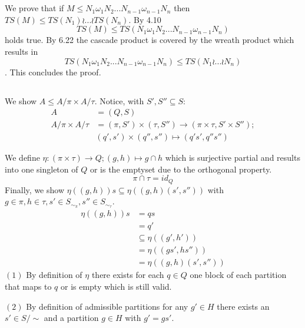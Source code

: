 \documentclass[a4paper,12pt,numbers=noenddot]{scrreport}
\begin{document}

\chapter{}
\section{}
We prove that if $M \leq N_1 \omega_1 N_2 ... N_{n-1}\omega_{n-1} N_n$ then $TS(M) \leq TS(N_1) \wr ... \wr TS(N_n)$.
By 4.10 
$$TS(M) \leq TS(N_1 \omega_1 N_2 ... N_{n-1}\omega_{n-1} N_n)$$ holds true.
By 6.22 the cascade product is covered by the wreath product which results in 
$$TS(N_1 \omega_1 N_2 ... N_{n-1}\omega_{n-1} N_n) \leq TS(N_1 \wr ... \wr N_n)$$.
This concludes the proof.
\section{}
We show $A \leq A/\pi \times A/\tau$.
Notice, with $S', S'' \subseteq S$:
\begin{align*}
    A &= (Q, S) \\
    A/\pi \times A/\tau &= (\pi, S') \times (\tau, S'') \rightarrow (\pi \times \tau, S' \times S'');\\
    &(q', s') \times (q'', s'') \mapsto (q's', q''s'')
\end{align*}

We define $\eta: (\pi \times \tau) \rightarrow Q; (g, h) \mapsto g \cap h$ which is surjective partial and results into one singleton of $Q$ or is the emptyset due to the orthogonal property.
$$\pi \cap \tau = id_Q$$
Finally, we show $\eta((g,h))s \subseteq \eta((g,h)(s',s''))$ with $g \in \pi, h \in \tau, s' \in S_{\sim_\pi}, s'' \in S_{\sim_\tau}$.
\begin{align*}
    \eta((g,h))s &= qs \\
                 &= q' \tag{1} \\
                 & \subseteq \eta((g', h')) \tag{2} \\
                 &= \eta((gs', hs'')) \\
                 &= \eta((g,h)(s',s''))
\end{align*}
$(1)$ By definition of $\eta$ there exists for each $q \in Q$ one block of each partition that maps to $q$ or is empty which is still valid.

$(2)$ By definition of admissible partitions for any $g' \in H$ there exists an $s' \in S/\sim$ and a partition $g \in H$ with $g' = gs'$.
\end{document}
